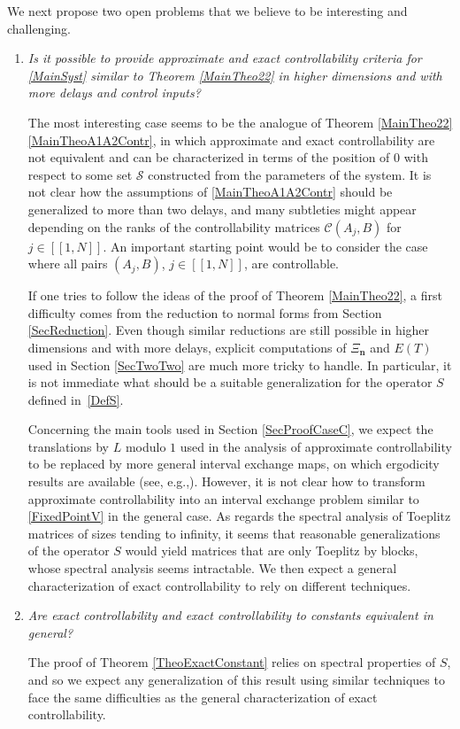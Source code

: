 \documentclass[10pt]{amsart}
\providecommand{\eg}{}
\renewcommand{\eg}{e.g.,\xspace}
\newcommand{\bn}{\boldsymbol{n}}
\newcommand{\llbracket}{[\![}
\newcommand{\rrbracket}{]\!]}
\theoremstyle{plain}
\theoremstyle{definition}
\begin{document}
We next propose two open problems that we believe to be interesting and challenging.\enlargethispage{-.1\baselineskip}%

\begin{enumerate}
\item \emph{Is it possible to provide approximate and exact controllability criteria for \eqref{MainSyst} similar to Theorem \ref{MainTheo22} in higher dimensions and with more delays and control inputs?}

The most interesting case seems to be the analogue of Theorem \ref{MainTheo22}\eqref{MainTheoA1A2Contr}, in which approximate and exact controllability are not equivalent and can be characterized in terms of the position of $0$ with respect to some set $\mathcal S$ constructed from the parameters of the system. It is not clear how the assumptions of \eqref{MainTheoA1A2Contr} should be generalized to more than two delays, and many subtleties might appear depending on the ranks of the controllability matrices $\mathcal C(A_j, B)$ for $j \in \llbracket 1, N\rrbracket$. An important starting point would be to consider the case where all pairs $(A_j, B)$, $j \in \llbracket 1, N\rrbracket$, are controllable.

If one tries to follow the ideas of the proof of Theorem \ref{MainTheo22}, a first difficulty comes from the reduction to normal forms from Section \ref{SecReduction}. Even though similar reductions are still possible in higher dimensions and with more delays, explicit computations of $\Xi_{\bn}$ and $E(T)$ used in Section \ref{SecTwoTwo} are much more tricky to handle. In particular, it is not immediate what should be a suitable generalization for the operator $S$ defined in~\eqref{DefS}.

Concerning the main tools used in Section \ref{SecProofCaseC}, we expect the translations by $L$ modulo $1$ used in the analysis of approximate controllability to be replaced by more general interval exchange maps, on which ergodicity results are available (see, \hbox{\eg \cite{Viana2006Ergodic}}). However, it is not clear how to transform approximate controllability into an interval exchange problem similar to \eqref{FixedPointV} in the general case. As regards the spectral analysis of Toeplitz matrices of sizes tending to infinity, it seems that reasonable generalizations of the operator $S$ would yield matrices that are only Toeplitz by blocks, whose spectral analysis seems intractable. We then expect a general characterization of exact controllability to rely on different techniques.

\item \emph{Are exact controllability and exact controllability to constants equivalent in general?}

The proof of Theorem \ref{TheoExactConstant} relies on spectral properties of $S$, and so we expect any generalization of this result using similar techniques to face the same difficulties as the general characterization of exact controllability.
\end{enumerate}
\end{document}
